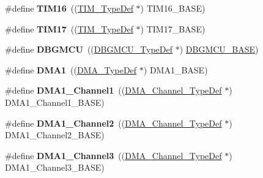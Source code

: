 \begin{DoxyCompactItemize}
\#define {\bfseries T\+I\+M16}~((\hyperlink{struct_t_i_m___type_def}{T\+I\+M\+\_\+\+Type\+Def} $\ast$) T\+I\+M16\+\_\+\+B\+A\+SE)
\item 
\mbox{\label{group___peripheral__declaration_ga65aea6c8b36439e44ad6cde0e6891aab}} 
\#define {\bfseries T\+I\+M17}~((\hyperlink{struct_t_i_m___type_def}{T\+I\+M\+\_\+\+Type\+Def} $\ast$) T\+I\+M17\+\_\+\+B\+A\+SE)
\item 
\mbox{\label{group___peripheral__declaration_ga92ec6d9ec2251fda7d4ce09748cd74b4}} 
\#define {\bfseries D\+B\+G\+M\+CU}~((\hyperlink{struct_d_b_g_m_c_u___type_def}{D\+B\+G\+M\+C\+U\+\_\+\+Type\+Def} $\ast$) \hyperlink{group___peripheral__memory__map_ga4adaf4fd82ccc3a538f1f27a70cdbbef}{D\+B\+G\+M\+C\+U\+\_\+\+B\+A\+SE})
\item 
\mbox{\label{group___peripheral__declaration_gacc16d2a5937f7585320a98f7f6b578f9}} 
\#define {\bfseries D\+M\+A1}~((\hyperlink{struct_d_m_a___type_def}{D\+M\+A\+\_\+\+Type\+Def} $\ast$) D\+M\+A1\+\_\+\+B\+A\+SE)
\item 
\mbox{\label{group___peripheral__declaration_gac83c5be824be1c02716e2522e80ddf7a}} 
\#define {\bfseries D\+M\+A1\+\_\+\+Channel1}~((\hyperlink{struct_d_m_a___channel___type_def}{D\+M\+A\+\_\+\+Channel\+\_\+\+Type\+Def} $\ast$) D\+M\+A1\+\_\+\+Channel1\+\_\+\+B\+A\+SE)
\item 
\mbox{\label{group___peripheral__declaration_ga23d7631dd10c645e06971b2543ba2949}} 
\#define {\bfseries D\+M\+A1\+\_\+\+Channel2}~((\hyperlink{struct_d_m_a___channel___type_def}{D\+M\+A\+\_\+\+Channel\+\_\+\+Type\+Def} $\ast$) D\+M\+A1\+\_\+\+Channel2\+\_\+\+B\+A\+SE)
\item 
\mbox{\label{group___peripheral__declaration_gacf7b6093a37b306d7f1f50b2f200f0d0}} 
\#define {\bfseries D\+M\+A1\+\_\+\+Channel3}~((\hyperlink{struct_d_m_a___channel___type_def}{D\+M\+A\+\_\+\+Channel\+\_\+\+Type\+Def} $\ast$) D\+M\+A1\+\_\+\+Channel3\+\_\+\+B\+A\+SE)
\item 
\mbox{\label{group___peripheral__declaration_gad2c42743316bf64da557130061b1f56a}} 

\end{DoxyCompactItemize}
